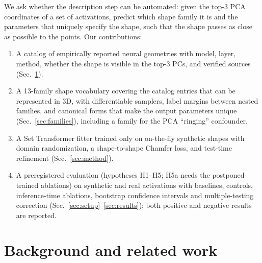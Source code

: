 \documentclass[10pt]{article}
\begin{document}
We ask whether the description step can be automated: given the top-3 PCA coordinates of a set of activations, predict which shape family it is and the parameters that uniquely specify the shape, such that the shape passes as close as possible to the points. Our contributions:
\begin{enumerate}
\item A catalog of empirically reported neural geometries with model, layer, method, whether the shape is visible in the top-3 PCs, and verified sources (Sec.~\ref{sec:catalog}).
\item A 13-family shape vocabulary covering the catalog entries that can be represented in 3D, with differentiable samplers, label margins between nested families, and canonical forms that make the output parameters unique (Sec.~\ref{sec:families}), including a family for the PCA ``ringing'' confounder.
\item A Set Transformer fitter trained only on on-the-fly synthetic shapes with domain randomization, a shape-to-shape Chamfer loss, and test-time refinement (Sec.~\ref{sec:method}).
\item A preregistered evaluation (hypotheses H1--H5; H5a needs the postponed trained ablations) on synthetic and real activations with baselines, controls, inference-time ablations, bootstrap confidence intervals and multiple-testing correction (Sec.~\ref{sec:setup}--\ref{sec:results}); both positive and negative results are reported.
\end{enumerate}

\section{Background and related work}
\label{sec:catalog}
\end{document}
